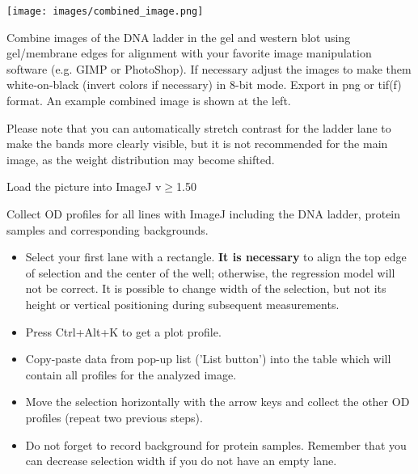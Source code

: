 \documentclass[11pt]{article}
\begin{document}
\begin{enumerate}
\begin{minipage}{0.4\linewidth}
	\hskip 10mm
\texttt{[image: images/combined\_image.png]}
\end{minipage}  \hskip 3mm
\begin{minipage}{0.57\linewidth}
	\item Combine images of the DNA ladder in the gel and western blot 
	using gel/membrane edges for alignment with your favorite image manipulation software (e.g. GIMP or PhotoShop). If necessary adjust the images to make them white-on-black (invert colors if necessary) in 8-bit mode. Export in png or tif(f) format. An example combined image is shown at the left.
	
	Please note that you can automatically stretch contrast for the ladder lane to make the bands more clearly visible, but it is not recommended for the main image, as the weight distribution may become shifted.
	
\end{minipage}


\item Load the picture into ImageJ v$\ge$1.50

\item Collect OD profiles for all lines with ImageJ including the DNA ladder, protein samples and corresponding backgrounds.

\begin{itemize}
	\item Select your first lane with a rectangle. \textbf{It is necessary} to align the top edge of selection and the center of the well; otherwise, the regression model will not be correct. It is possible to change width of the selection, but not its height or vertical positioning during subsequent measurements.
	\item Press Ctrl+Alt+K to get a plot profile.
	\item Copy-paste data from pop-up list ('List button') into the table which will contain all profiles for the analyzed image. 
	\item Move the selection horizontally with the arrow keys and collect the other OD profiles (repeat two previous steps).
	\item Do not forget to record background for protein samples. Remember that you can decrease selection width if you do not have an empty lane. 
\end{itemize}



\bigskip 


\end{enumerate}
\end{document}
